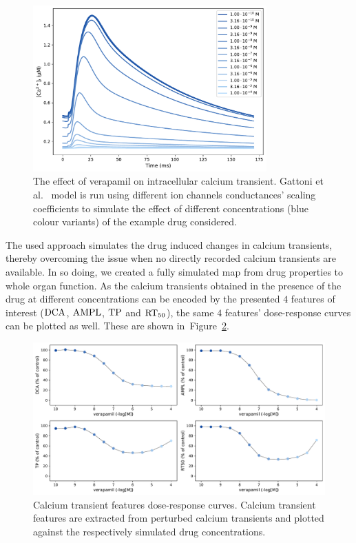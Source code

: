 \begin{figure}[!ht]
    \myfloatalign
    \includegraphics[width=0.8\textwidth]{figures/chapter06/verapamil_calcium_curve_drug.pdf}
    \caption{The effect of verapamil on intracellular calcium transient. Gattoni et al.~\cite{Gattoni:2017} model is run using different ion channels conductances' scaling coefficients to simulate the effect of different concentrations (blue colour variants) of the example drug considered.}
    \label{fig:calciumverapamil}
\end{figure}

\noindent
The used approach simulates the drug induced changes in calcium transients, thereby overcoming the issue when no directly recorded calcium transients are available. In so doing, we created a fully simulated map from drug properties to whole organ function. As the calcium transients obtained in the presence of the drug at different concentrations can be encoded by the presented $4$ features of interest ($\textrm{DCA}$, $\textrm{AMPL}$, $\textrm{TP}$ and $\textrm{RT}_{50}$), the same $4$ features' dose-response curves can be plotted as well. These are shown in~Figure~\ref{fig:cafeatsverapamilrespcurve}.

\begin{figure}[!ht]
    \myfloatalign
    \includegraphics[width=\textwidth]{figures/chapter06/verapamil_dose_calcium_response_curve_drug.pdf}
    \caption{Calcium transient features dose-response curves. Calcium transient features are extracted from perturbed calcium transients and plotted against the respectively simulated drug concentrations.}
    \label{fig:cafeatsverapamilrespcurve}
\end{figure}

